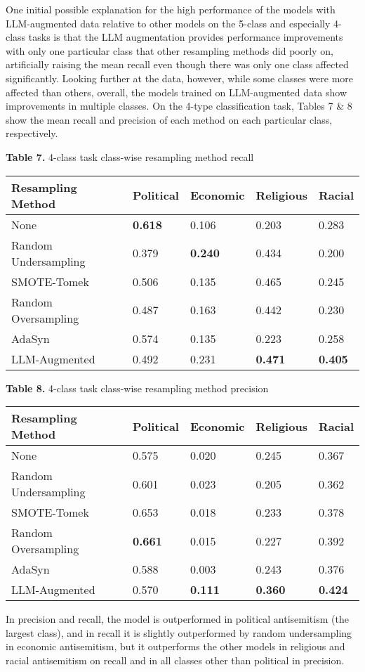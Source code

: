 \documentclass[runningheads]{llncs}
\newenvironment{nscenter}
 {\parskip=0pt\par\nopagebreak\centering}
 {\par\noindent\ignorespacesafterend}
\begin{document}
One initial possible explanation for the high performance of the models with LLM-augmented data relative to other models on the 5-class and especially 4-class tasks is that the LLM augmentation provides performance improvements with only one particular class that other resampling methods did poorly on, artificially raising the mean recall even though there was only one class affected significantly. Looking further at the data, however, while some classes were more affected than others, overall, the models trained on LLM-augmented data show improvements in multiple classes. On the 4-type classification task, Tables 7 \& 8 show the mean recall and precision of each method on each particular class, respectively.
\begin{nscenter}
{\bf Table 7.} 4-class task class-wise resampling method recall\\

\begin{tabular}{|l|l|l|l|l|}
\hline
Resampling Method & Political & Economic & Religious & Racial \\\hline
None & {\bf 0.618} & 0.106 & 0.203 & 0.283  \\\hline
Random Undersampling & 0.379 & {\bf 0.240} & 0.434 &  0.200 \\\hline
SMOTE-Tomek & 0.506 & 0.135 & 0.465 & 0.245 \\\hline
Random Oversampling & 0.487 & 0.163 & 0.442 & 0.230 \\\hline
AdaSyn & 0.574 & 0.135 & 0.223 & 0.258 \\\hline
LLM-Augmented & 0.492 & 0.231 & {\bf 0.471} & {\bf 0.405} \\\hline
\end{tabular}

{\bf Table 8.} 4-class task class-wise resampling method precision\\

\begin{tabular}{|l|l|l|l|l|}
\hline
Resampling Method & Political & Economic & Religious & Racial \\\hline
None & 0.575 & 0.020 & 0.245 & 0.367 \\\hline
Random Undersampling & 0.601 & 0.023 & 0.205 & 0.362 \\\hline
SMOTE-Tomek & 0.653 & 0.018 & 0.233 & 0.378 \\\hline
Random Oversampling & {\bf 0.661} & 0.015 & 0.227 & 0.392  \\\hline
AdaSyn & 0.588 & 0.003 & 0.243 & 0.376 \\\hline
LLM-Augmented & 0.570 & {\bf 0.111} & {\bf 0.360} & {\bf 0.424} \\\hline
\end{tabular}
\end{nscenter}
In precision and recall, the model is outperformed in political antisemitism (the largest class), and in recall it is slightly outperformed by random undersampling in economic antisemitism, but it outperforms the other models in religious and racial antisemitism on recall and in all classes other than political in precision.
\end{document}
